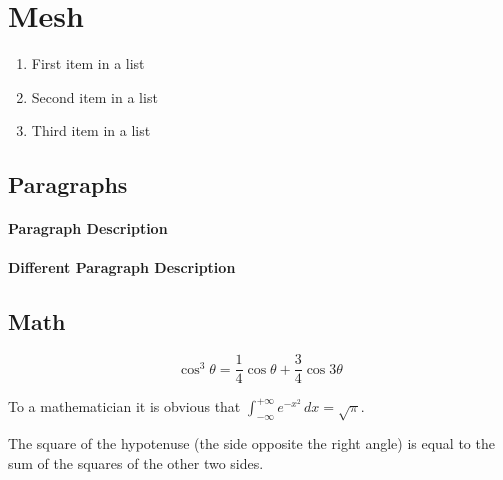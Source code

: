 \documentclass[
10pt, %
a4paper, %
oneside, %
headinclude,footinclude, %
BCOR5mm, %
]{scrartcl}
\begin{document}
\section{Mesh}

\newpage

\begin{enumerate}[noitemsep] %
\item First item in a list
\item Second item in a list
\item Third item in a list
\end{enumerate}


\subsection{Paragraphs}

\lipsum[6] %

\paragraph{Paragraph Description} \lipsum[7] %

\paragraph{Different Paragraph Description} \lipsum[8] %


\subsection{Math}

\lipsum[4] %

\begin{equation}
\cos^3 \theta =\frac{1}{4}\cos\theta+\frac{3}{4}\cos 3\theta
\label{eq:refname2}
\end{equation}

\lipsum[5] %

\begin{definition}[Gauss] 
To a mathematician it is obvious that
$\int_{-\infty}^{+\infty}
e^{-x^2}\,dx=\sqrt{\pi}$. 
\end{definition} 

\begin{theorem}[Pythagoras]
The square of the hypotenuse (the side opposite the right angle) is equal to the sum of the squares of the other two sides.
\end{theorem}
\end{document}
